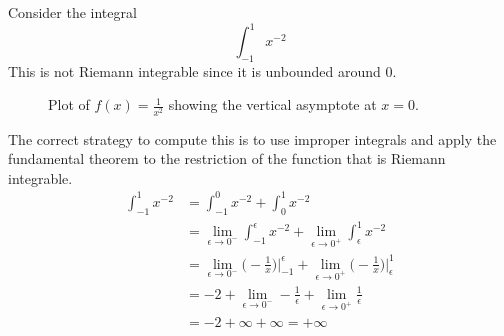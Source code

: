   \begin{example}
    \label{ex:vertical-asymptotes}
    Consider the integral
    \begin{equation}
      \int_{-1}^1 x^{-2} 
    \end{equation}
    This is not Riemann integrable since it is unbounded around $0$. 

    \begin{figure}[H]
      \centering 
      \caption{Plot of $f(x) = \frac{1}{x^2}$ showing the vertical asymptote at $x=0$.} 
      \label{fig:inverse_square_plot}
    \end{figure}
  
    The correct strategy to compute this is to use improper integrals and apply the fundamental theorem to the restriction of the function that is Riemann integrable. 
    \begin{align}
      \int_{-1}^1 x^{-2} & = \int_{-1}^0 x^{-2} + \int_0^1 x^{-2} \\  
                         & = \lim_{\epsilon \to 0^-} \int_{-1}^\epsilon x^{-2} + \lim_{\epsilon \to 0^+} \int_\epsilon^{1} x^{-2} \\ 
                         & = \lim_{\epsilon \to 0^-} \bigg( -\frac{1}{x} \bigg) \bigg|_{-1}^\epsilon + \lim_{\epsilon \to 0^+} \bigg( -\frac{1}{x} \bigg) \bigg|_\epsilon^1 \\ 
                         & = -2 + \lim_{\epsilon \to 0^-} -\frac{1}{\epsilon} + \lim_{\epsilon \to 0^+} \frac{1}{\epsilon} \\ 
                         & = -2 + \infty + \infty = +\infty
    \end{align}
  \end{example}


